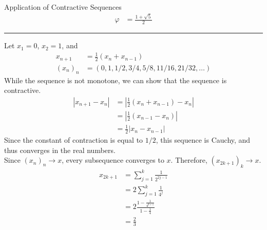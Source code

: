 \documentclass[8pt]{extarticle}
\begin{document}
\begin{problem}{Application of Contractive Sequences}
\begin{align*}
      \varphi &= \frac{1 + \sqrt{5}}{2}
    \end{align*}
    \vspace{4pt}
    \rule{\textwidth}{0.4pt}
    \vspace{4pt}
    Let $x_1 = 0$, $x_2 = 1$, and
    \begin{align*}
      x_{n+1} &= \frac{1}{2}(x_n + x_{n-1})\\
      (x_n)_n &= \left(0,1,1/2,3/4,5/8,11/16,21/32,\dots\right)
    \end{align*}
    While the sequence is not monotone, we can show that the sequence is contractive.
    \begin{align*}
      |x_{n+1}-x_n| &= \left|\frac{1}{2}\left(x_{n}+x_{n-1}\right) - x_n\right|\\
                    &= \left|\frac{1}{2}\left(x_{n-1}-x_n\right)\right|\\
                    &= \frac{1}{2}|x_n-x_{n-1}|
    \end{align*}
    Since the constant of contraction is equal to $1/2$, this sequence is Cauchy, and thus converges in the real numbers.\\

    Since $(x_n)_n\rightarrow x$, every subsequence converges to $x$. Therefore, $(x_{2k+1})_k\rightarrow x$.
    \begin{align*}
      x_{2k+1} &= \sum_{j=1}^{k} \frac{1}{2^{2j-1}}\\
               &= 2 \sum_{j=1}^{k}\frac{1}{4^j}\\
               &= 2 \frac{1-\frac{1}{4^{k+1}}}{1-\frac{1}{4}}\\
               &= \frac{2}{3} \tag*{$k\rightarrow\infty$}
    \end{align*}
  \end{problem}
\end{document}
